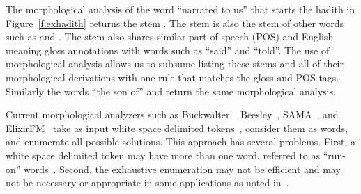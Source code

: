 \documentclass[11pt]{article}
\begin{document}
The morphological analysis of the word  
``narrated to us'' that starts the hadith in Figure~\ref{f:exhadith}
returns the stem .
The stem   is also the stem of other 
words such as  and .
The stem also shares similar part of speech (POS)
and English meaning gloss annotations with words
such as  ``said'' and  ``told''. 
The use of morphological analysis allows us to 
subsume listing these stems and all of their morphological
derivations with one rule that matches the gloss and 
POS tags. 
Similarly the words  ``the son of'' and  
return the same morphological analysis.
         


\novocalize

Current morphological analyzers such as 
Buckwalter~,
Beesley~,
SAMA~\cite{Kulick:10},
and ElixirFM~\cite{Otakar:07} 
take as input white space delimited tokens~\cite{Kulick:10},
consider them as words,
and enumerate all possible solutions. 
This approach has several problems. 
First, a white space delimited token may have 
more than one word, referred to as ``run-on'' 
words~\cite{Buckwalter:04}.
Second, the exhaustive enumeration may not be efficient and may
not be necessary or appropriate
in some applications as noted in~\cite{Maamouri:10}. 
\end{document}
